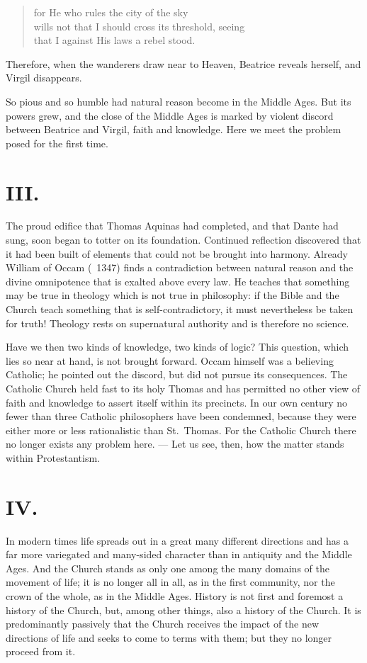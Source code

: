 \documentclass[12pt,a4paper]{article}
\begin{document}
\begin{quote}
for He who rules the city of the sky\\
wills not that I should cross its threshold, seeing\\
that I against His laws a rebel stood.
\end{quote}

Therefore, when the wanderers draw near to Heaven, Beatrice reveals herself,
and Virgil disappears.

So pious and so humble had natural reason become in the Middle Ages. But its
powers grew, and the close of the Middle Ages is marked by violent discord
between Beatrice and Virgil, faith and knowledge. Here we meet the problem
posed for the first time.

\section*{III.}

The proud edifice that Thomas Aquinas had completed, and that Dante had sung,
soon began to totter on its foundation. Continued reflection discovered that
it had been built of elements that could not be brought into harmony. Already
William of Occam (\dag\ 1347) finds a contradiction between natural reason and
the divine omnipotence that is exalted above every law. He teaches that
something may be true in theology which is not true in philosophy: if the
Bible and the Church teach something that is self-contradictory, it must
nevertheless be taken for truth! Theology rests on supernatural authority and
is therefore no science.

Have we then two kinds of knowledge, two kinds of logic? This question, which
lies so near at hand, is not brought forward. Occam himself was a believing
Catholic; he pointed out the discord, but did not pursue its consequences. The
Catholic Church held fast to its holy Thomas and has permitted no other view
of faith and knowledge to assert itself within its precincts. In our own
century no fewer than three Catholic philosophers have been condemned, because
they were either more or less rationalistic than St.~Thomas. For the Catholic
Church there no longer exists any problem here. --- Let us see, then, how the
matter stands within Protestantism.

\section*{IV.}

In modern times life spreads out in a great many different directions and has
a far more variegated and many-sided character than in antiquity and the
Middle Ages. And the Church stands as only one among the many domains of the
movement of life; it is no longer all in all, as in the first community, nor
the crown of the whole, as in the Middle Ages. History is not first and
foremost a history of the Church, but, among other things, also a history of
the Church. It is predominantly passively that the Church receives the impact
of the new directions of life and seeks to come to terms with them; but they
no longer proceed from it.
\end{document}

